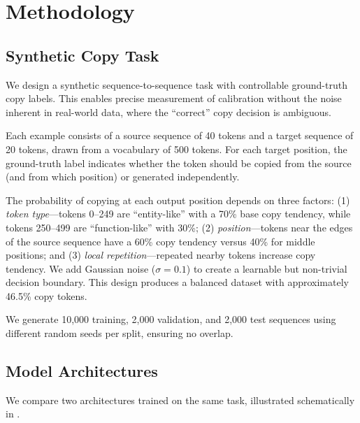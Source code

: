 \section{Methodology}
\label{sec:method}

\subsection{Synthetic Copy Task}
\label{sec:data}

We design a synthetic sequence-to-sequence task with controllable ground-truth copy labels. This enables precise measurement of calibration without the noise inherent in real-world data, where the ``correct'' copy decision is ambiguous.

 Each example consists of a source sequence of 40 tokens and a target sequence of 20 tokens, drawn from a vocabulary of 500 tokens. For each target position, the ground-truth label indicates whether the token should be copied from the source (and from which position) or generated independently.

 The probability of copying at each output position depends on three factors: (1) \emph{token type}---tokens 0--249 are ``entity-like'' with a 70\% base copy tendency, while tokens 250--499 are ``function-like'' with 30\%; (2) \emph{position}---tokens near the edges of the source sequence have a 60\% copy tendency versus 40\% for middle positions; and (3) \emph{local repetition}---repeated nearby tokens increase copy tendency. We add Gaussian noise ($\sigma = 0.1$) to create a learnable but non-trivial decision boundary. This design produces a balanced dataset with approximately 46.5\% copy tokens.

 We generate 10,000 training, 2,000 validation, and 2,000 test sequences using different random seeds per split, ensuring no overlap.

\subsection{Model Architectures}
\label{sec:models}

We compare two architectures trained on the same task, illustrated schematically in .

